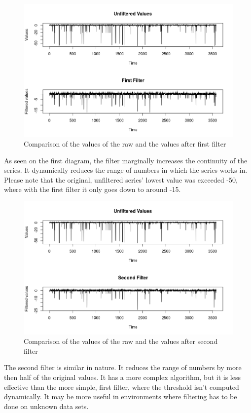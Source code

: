 \begin{figure}[h!]
	\centering
		\includegraphics[width=.9\linewidth]{figures/comp1.png}
		\caption{Comparison of the values of the raw and the values after first filter \cite{firstcomp}}\label{fig:firstComp}
\end{figure}


As seen on the first diagram, the filter marginally increases the continuity of the series.
It dynamically reduces the range of numbers in which the series works in. Please note that the original, unfiltered series' lowest value was exceeded -50, where with the first filter it only goes down to around -15.


\begin{figure}[h!]
	\centering
		\includegraphics[width=.9\linewidth]{figures/comp2.png}
		\caption{Comparison of the values of the raw and the values after second filter \cite{secondcomp}}\label{fig:secondComp}
\end{figure}

The second filter is similar in nature. It reduces the range of numbers by more then half of the original values. It has a more complex algorithm, but it is less effective than the more simple, first filter, where the threshold isn't computed dynamically. It may be more useful in environments where filtering has to be done on unknown data sets.

